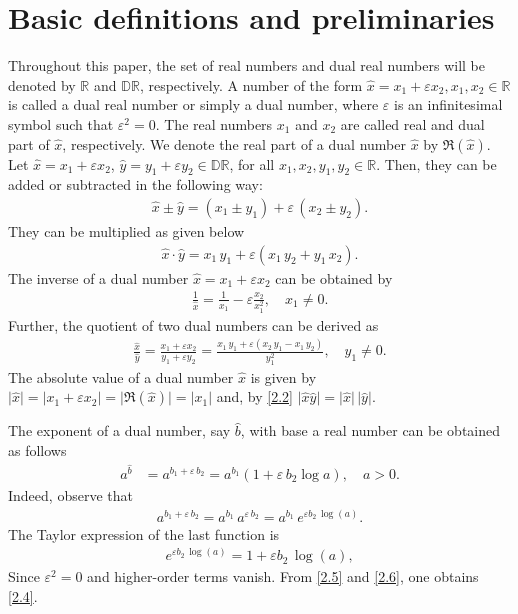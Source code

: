 \documentclass[11pt,a4paper,fleqn]{article}
\numberwithin{equation}{section}
\numberwithin{lemma}{section}
\numberwithin{theorem}{section}
\numberwithin{corollary}{section}
\begin{document}
\section{Basic definitions and preliminaries}
Throughout this paper, the set of real numbers and dual real numbers will be denoted by $\mathbb{R}$ and $\mathbb{D} \mathbb{R}$, respectively. A number of the form $\widehat{x} = x_1 + \varepsilon x_2, x_1, x_2 \in \mathbb{R}$ is called a dual real number or simply a dual number,  where $\varepsilon$ is an infinitesimal symbol  such that $\varepsilon^2 = 0$. The real numbers $x_1$ and $x_2$ are called real and dual part of $\widehat{x}$, respectively. We denote the real part of a dual number $\widehat{x}$ by $\Re(\widehat{x})$. Let $\widehat{x} = x_1 + \varepsilon x_2$, $\widehat{y} = y_1 + \varepsilon y_2 \in \mathbb{D}\mathbb{R}$, for all $x_1, x_2, y_1, y_2 \in \mathbb{R}$. Then, 
they can be added or subtracted in the following way:
\begin{align}
	\widehat{x} \pm \widehat{y} = (x_1 \pm y_1) + \varepsilon \, (x_2 \pm y_2).
\end{align}
They can be multiplied as given below
\begin{align}
	\widehat{x} \cdot  \widehat{y} =   x_1 \, y_1 + \varepsilon (x_1 \, y_2 + y_1 \, x_2).\label{2.2}
\end{align}
The inverse of a dual number $\widehat{x} = x_1 + \varepsilon x_2$ can be obtained by
\begin{align}
	\frac{1}{\widehat{x}}  = \frac{1}{x_1} - \varepsilon \frac{x_2}{x_1^2}, \quad x_1 \ne 0.
\end{align}
Further, the quotient of two dual numbers can be derived as
\begin{align}
	\frac{\widehat{x}}{\widehat{y}} = \frac{x_1 + \varepsilon x_2}{y_1 + \varepsilon y_2} = \frac{x_1 \, y_1 + \varepsilon (x_2 \, y_1 - x_1 \, y_2)}{y_1^2}, \quad y_1 \ne 0. \label{e2.4}
\end{align}
The absolute value of a dual number $\widehat{x}$ is given by $\vert \widehat{x}\vert = \vert x_1 + \varepsilon x_2\vert = \vert \Re (\widehat{x})\vert = \vert x_1\vert$ and, by \eqref{2.2} $\vert\widehat{x} \widehat{y}\vert = \vert\widehat{x}\vert \, \vert \widehat{y}\vert$. 

The exponent of a dual number, say $\widehat{b}$, with base a real number can be obtained as follows
\begin{align}
	a^{\widehat{b}} & = a^{b_1 + \varepsilon \, b_2} = a^{b_1} (1 + \varepsilon \, b_2 \log a), \quad a > 0.\label{2.4}
\end{align}
Indeed, observe that
\begin{align}
a^{b_1 + \varepsilon \, b_2} = a^{b_1} \, a^{\varepsilon \, b_2} = a^{b_1} \, e^{\varepsilon b_2 \, \log (a)}. \label{2.5}
\end{align}
The Taylor expression of the last function is 
\begin{align}
e^{\varepsilon b_2 \, \log (a)} = 1 + {\varepsilon b_2 \, \log (a)}, \label{2.6}
\end{align}
Since $\varepsilon^2 = 0$ and higher-order terms vanish. From \eqref{2.5} and \eqref{2.6}, one obtains \eqref{2.4}. 
\end{document}
